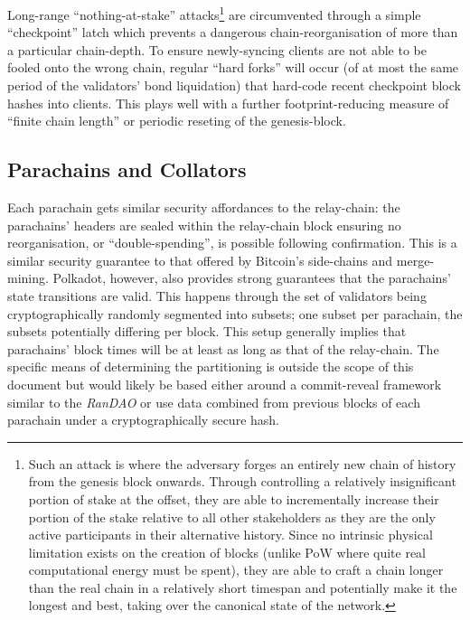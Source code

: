 \documentclass[9pt,oneside]{amsart}
\begin{document}
\begin{multicols}{2}
Long-range ``nothing-at-stake'' attacks\footnote{Such an attack is where the adversary forges an entirely new chain of history from the genesis block onwards. Through controlling a relatively insignificant portion of stake at the offset, they are able to incrementally increase their portion of the stake relative to all other stakeholders as they are the only active participants in their alternative history. Since no intrinsic physical limitation exists on the creation of blocks (unlike PoW where quite real computational energy must be spent), they are able to craft a chain longer than the real chain in a relatively short timespan and potentially make it the longest and best, taking over the canonical state of the network.} are circumvented through a simple ``checkpoint'' latch which prevents a dangerous chain-reorganisation of more than a particular chain-depth. To ensure newly-syncing clients are not able to be fooled onto the wrong chain, regular ``hard forks'' will occur (of at most the same period of the validators' bond liquidation) that hard-code recent checkpoint block hashes into clients. This plays well with a further footprint-reducing measure of ``finite chain length'' or periodic reseting of the genesis-block.

\subsection{Parachains and Collators}\label{parachains-and-collators}

 Each parachain gets similar security affordances to the relay-chain: the parachains' headers are sealed within the relay-chain block ensuring no reorganisation, or ``double-spending'', is possible following confirmation. This is a similar security guarantee to that offered by Bitcoin's side-chains and merge-mining. Polkadot, however, also provides strong guarantees that the parachains' state transitions are valid. This happens through the set of validators being cryptographically randomly segmented into subsets; one subset per parachain, the subsets potentially differing per block. This setup generally implies that parachains' block times will be at least as long as that of the relay-chain. The specific means of determining the partitioning is outside the scope of this document but would likely be based either around a commit-reveal framework similar to the \textit{RanDAO}\cite{randao} or use data combined from previous blocks of each parachain under a cryptographically secure hash.


\end{multicols}
\end{document}
